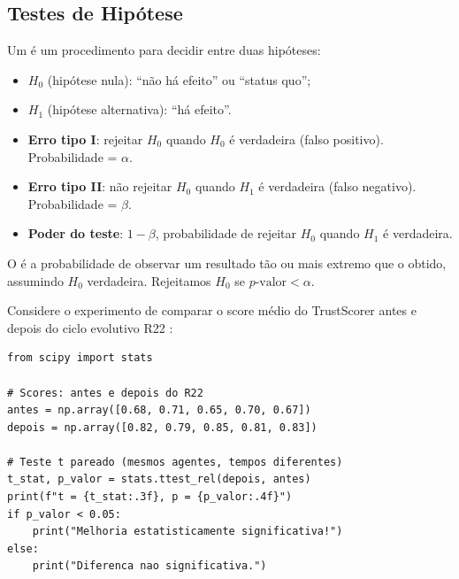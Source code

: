 \subsection{Testes de Hipótese}

\begin{definicao}
    Um  é um procedimento para decidir entre
    duas hipóteses:
    \begin{itemize}
        \item $H_0$ (hipótese nula): ``não há efeito'' ou ``status quo'';
        \item $H_1$ (hipótese alternativa): ``há efeito''.
    \end{itemize}
\end{definicao}

\begin{definicao}
    \begin{itemize}
        \item \textbf{Erro tipo I}: rejeitar $H_0$ quando $H_0$ é verdadeira
              (falso positivo). Probabilidade = $\alpha$.
        \item \textbf{Erro tipo II}: não rejeitar $H_0$ quando $H_1$ é
              verdadeira (falso negativo). Probabilidade = $\beta$.
        \item \textbf{Poder do teste}: $1 - \beta$, probabilidade de rejeitar
              $H_0$ quando $H_1$ é verdadeira.
    \end{itemize}
\end{definicao}

\begin{definicao}[p-valor]
    O  é a probabilidade de observar um resultado tão ou
    mais extremo que o obtido, assumindo $H_0$ verdadeira. Rejeitamos $H_0$
    se $p\text{-valor} < \alpha$.
\end{definicao}

\begin{exemplo}
    Considere o experimento de comparar o score médio do TrustScorer
    antes e depois do ciclo evolutivo R22 \cite{opencode2026ecosystem}:
    \begin{lstlisting}[style=pythonstyle]
from scipy import stats

# Scores: antes e depois do R22
antes = np.array([0.68, 0.71, 0.65, 0.70, 0.67])
depois = np.array([0.82, 0.79, 0.85, 0.81, 0.83])

# Teste t pareado (mesmos agentes, tempos diferentes)
t_stat, p_valor = stats.ttest_rel(depois, antes)
print(f"t = {t_stat:.3f}, p = {p_valor:.4f}")
if p_valor < 0.05:
    print("Melhoria estatisticamente significativa!")
else:
    print("Diferenca nao significativa.")
    \end{lstlisting}
\end{exemplo}

